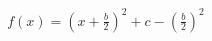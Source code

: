\documentclass[preview]{standalone}
\begin{document}
\begin{align*}
f(x) = \left(x + \frac{b}{2}\right)^2 + c - \left(\frac{b}{2}\right)^2
\end{align*}
\end{document}
